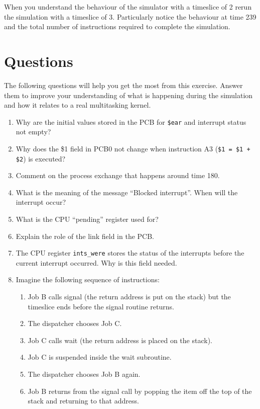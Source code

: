 \documentclass[a4paper,10pt]{article}
\begin{document}
When you understand the behaviour of the simulator with a timeslice of
2 rerun the simulation with a timeslice of 3.  Particularly notice
the behaviour at time 239 and the total number of instructions
required to complete the simulation.

\section{Questions}
\renewcommand{\theenumi}{\arabic{enumi}}
The following questions will help you get the most from this exercise.
Answer them to improve your understanding of what is happening during
the simulation and how it relates to a real multitasking kernel.

\begin{enumerate}
\item
Why are the initial values stored in the PCB for \texttt{\$ear} and
interrupt status not empty?

\item
Why does the \$1 field in PCB0 not change when instruction 
A3 (\verb_$1 = $1 + $2_) is executed?


\item
Comment on the process exchange that happens around time 180.

\item
What is the meaning of the message ``Blocked interrupt''.  When will
the interrupt occur?

\item 
What is the CPU ``pending'' register used for?

\item 
Explain the role of the link field in the PCB.

\item
The CPU register \verb+ints_were+ stores the status of the interrupts
before the current interrupt occurred.  Why is this field needed.  

\item 

Imagine the following sequence of instructions:
\begin{enumerate}
\item Job B calls signal (the return address is put on the stack) but
      the timeslice ends before the signal routine returns.
\item The dispatcher chooses Job C.
\item Job C calls wait (the return address is placed on the stack).
\item Job C is suspended inside the wait subroutine. 
\item The dispatcher chooses Job B again.
\item Job B returns from the signal call by popping the item off the
      top of the stack and returning to that address.
\end{enumerate}


\end{enumerate}
\end{document}
